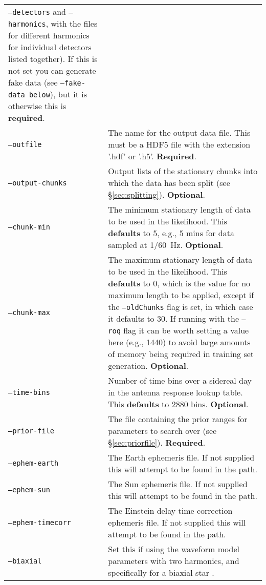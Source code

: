 \begin{footnotesize}
\begin{longtable}{|p{}p{}|}
                            {\tt --detectors} and {\tt --harmonics}, with the files for different harmonics for individual detectors listed together). If this is not
                            set you can generate fake data (see {\tt --fake-data below}), but it is otherwise this is {\bf required}. \\
 {\tt --outfile}         &  The name for the output data file. This must be a HDF5 file with the extension '.hdf' or '.h5'. {\bf Required}. \\
 {\tt --output-chunks}   &  Output lists of the stationary chunks into which the data has been split (see \S\ref{sec:splitting}). {\bf Optional}. \\
 {\tt --chunk-min}       &  The minimum stationary length of data to be used in the likelihood. This {\bf defaults} to 5, e.g., 5 mins for data
                            sampled at 1/60~Hz. {\bf Optional}. \\
 {\tt --chunk-max}       &  The maximum stationary length of data to be used in the likelihood. This {\bf defaults} to 0, which is the value for no
                            maximum length to be applied, except if the {\tt --oldChunks} flag is set, in which case it defaults to 30. If running with the
                            {\tt --roq} flag it can be worth setting a value here (e.g., 1440) to avoid large amounts of memory being required in training
                            set generation. {\bf Optional}. \\
 {\tt --time-bins}       &  Number of time bins over a sidereal day in the antenna response lookup table. This {\bf defaults} to 2880 bins. {\bf Optional}. \\
 {\tt --prior-file}      &  The file containing the prior ranges for parameters to search over (see \S\ref{sec:priorfile}). {\bf Required}. \\
 {\tt --ephem-earth}     &  The Earth ephemeris file. If not supplied this will attempt to be found in the path. \\
 {\tt --ephem-sun}       &  The Sun ephemeris file. If not supplied this will attempt to be found in the path. \\
 {\tt --ephem-timecorr}  &  The Einstein delay time correction ephemeris file. If not supplied this will attempt to be found in the path. \\
 {\tt --biaxial}         &  Set this if using the waveform model parameters with two harmonics, and specifically for a biaxial star \citep[see, e.g.,][]{2015MNRAS.453.4399P}. \\

\end{longtable}
\end{footnotesize}
